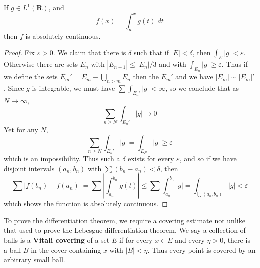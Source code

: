 \begin{theorem}
  If $g \in L^1(\mathbf{R})$, and
  \[ f(x) = \int_a^x g(t)\; dt \]
  then $f$ is absolutely continuous.
\end{theorem}
\begin{proof}
  Fix $\varepsilon > 0$. We claim that there is $\delta$ such that if $|E| < \delta$, then $\int_E |g| < \varepsilon$. Otherwise there are sets $E_n$ with $|E_{n+1}| \leq |E_n|/3$ and with $\int_{E_n} |g| \geq \varepsilon$. Thus if we define the sets $E_m' = E_m - \bigcup_{n > m} E_n$ then the $E_m'$ and we have $|E_m| \sim |E_m|'$. Since $g$ is integrable, we must have $\sum \int_{E_n'} |g| < \infty$, so we conclude that as $N \to \infty$,
  \[ \sum_{n \geq N} \int_{E_n'} |g| \to 0 \]
  Yet for any $N$,
  \[ \sum_{n \geq N} \int_{E_n'} |g| = \int_{E_N} |g| \geq \varepsilon \]
  which is an impossibility. Thus such a $\delta$ exists for every $\varepsilon$, and so if we have disjoint intervals $(a_n,b_n)$ with $\sum (b_n - a_n) < \delta$, then
  \[ \sum |f(b_n) - f(a_n)| = \sum \left| \int_{a_n}^{b_n} g(t) \right| \leq \sum \int_{a_n}^{b_n} |g| = \int_{\bigcup (a_n,b_n)} |g| < \varepsilon \]
  which shows the function is absolutely continuous.
\end{proof}

To prove the differentiation theorem, we require a covering estimate not unlike that used to prove the Lebesgue differentiation theorem. We say a collection of balls is a {\bf Vitali covering} of a set $E$ if for every $x \in E$ and every $\eta > 0$, there is a ball $B$ in the cover containing $x$ with $|B| < \eta$. Thus every point is covered by an arbitrary small ball.

